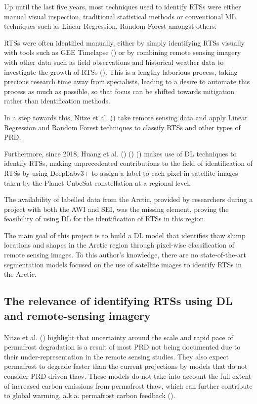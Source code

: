 Up until the last five years, most techniques used to identify \gls{RTS}s were either manual visual inspection, traditional statistical methods or conventional \gls{ML} techniques such as Linear Regression, Random Forest amongst others.

\gls{RTS}s were often identified manually, either by simply identifying \gls{RTS}s visually with tools such as \gls{GEE} Timelapse (\cite{lewkowicz_extremes_2019}) or by combining remote sensing imagery with other data such as field observations and historical weather data to investigate the growth of \gls{RTS}s (\cite{KOKELJ201556}). This is a lengthy laborious process, taking precious research time away from specialists, leading to a desire to automate this process as much as possible, so that focus can be shifted towards mitigation rather than identification methods.

In a step towards this, Nitze et al. (\cite{articleing2018}) take remote sensing data and apply Linear Regression and Random Forest techniques to classify \gls{RTS}s and other types of \gls{PRD}.

Furthermore, since 2018, Huang et al. (\cite{HUANG10122067}) (\cite{HUANG2020111534}) (\cite{HUANG2021102399}) makes use of \gls{DL} techniques to identify \gls{RTS}s, making unprecedented contributions to the field of identification of \gls{RTS}s by using DeepLabv3+ to assign a label to each pixel in satellite images taken by the Planet CubeSat constellation at a regional level.

The availability of labelled data from the Arctic, provided by researchers during a project with both the \gls{AWI} and \gls{SEI}, was the missing element, proving the feasibility of using DL for the identification of \gls{RTS}s in this region.

The main goal of this project is to build a \gls{DL} model that identifies thaw slump locations and shapes in the Arctic region through pixel-wise classification of remote sensing images. 
To this author's knowledge, there are no state-of-the-art segmentation models focused on the use of satellite images to identify \gls{RTS}s in the Arctic.

\subsection{The relevance of identifying \gls{RTS}s using \gls{DL} and remote-sensing imagery} \label{rts_ref}
\paragraph{}
Nitze et al. (\cite{articleing2018}) highlight that uncertainty around the scale and rapid pace of permafrost degradation is a result of most \gls{PRD} not being documented due to their under-representation in the remote sensing studies. 
They also expect permafrost to degrade faster than the current projections by models that do not consider \gls{PRD}-driven thaw. These models do not take into account the full extent of increased carbon emissions from permafrost thaw, which can further contribute to global warming, \gls{a.k.a.} permafrost carbon feedback (\cite{articlecarbonfeedback}).


